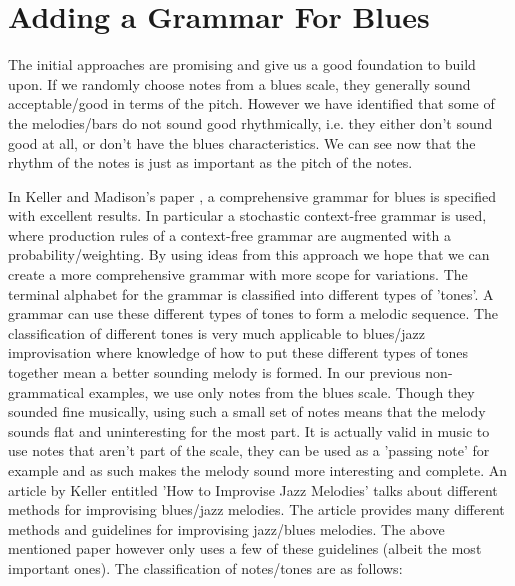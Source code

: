\documentclass[pdftex,12pt,a4paper]{report}
\begin{document}
\section{Adding a Grammar For Blues}
The initial approaches are promising and give us a good foundation to build upon. If we randomly choose notes from a blues scale, they generally sound acceptable/good in terms of the pitch. However we have identified that some of the melodies/bars do not sound good rhythmically, i.e. they either don't sound good at all, or don't have the blues characteristics. We can see now that the rhythm of the notes is just as important as the pitch of the notes. 

In Keller and Madison's paper \cite{keller07}, a comprehensive grammar for blues is specified with excellent results. In particular a stochastic context-free grammar is used, where production rules of a context-free grammar are augmented with a probability/weighting. By using ideas from this approach we hope that we can create a more comprehensive grammar with more scope for variations. The terminal alphabet for the grammar is classified into different types of 'tones'. A grammar can use these different types of tones to form a melodic sequence. The classification of different tones is very much applicable to blues/jazz improvisation where knowledge of how to put these different types of tones together mean a better sounding melody is formed. In our previous non-grammatical examples, we use only notes from the blues scale. Though they sounded fine musically, using such a small set of notes means that the melody sounds flat and uninteresting for the most part. It is actually valid in music to use notes that aren't part of the scale, they can be used as a 'passing note' for example and as such makes the melody sound more interesting and complete. An article by Keller entitled 'How to Improvise Jazz Melodies' \cite{jazzkeller} talks about different methods for improvising blues/jazz melodies. The article provides many different methods and guidelines for improvising jazz/blues melodies. The above mentioned paper \cite{keller07} however only uses a few of these guidelines (albeit the most important ones). The classification of notes/tones are as follows:
\end{document}
